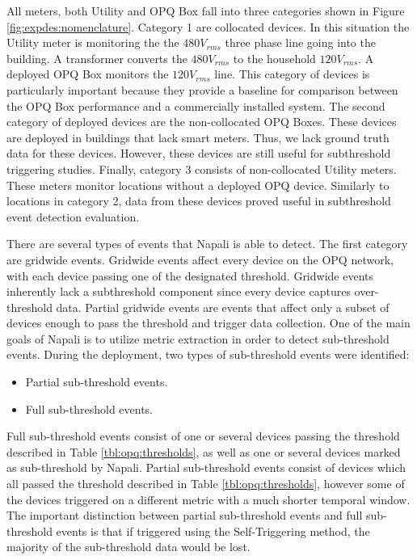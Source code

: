 All meters, both Utility and OPQ Box fall into three categories shown in Figure \ref{fig:expdes:nomenclature}.
Category 1 are collocated devices.
In this situation the Utility meter is monitoring the the $480V_{rms}$ three phase line going into the building.
A transformer converts the $480V_{rms}$ to the household $120V_{rms}$.
A deployed OPQ Box monitors the $120V_{rms}$ line.
This category of devices is particularly important because they provide a baseline for comparison between the OPQ Box performance and a commercially installed system.
The second category of deployed devices are the non-collocated OPQ Boxes.
These devices are deployed in buildings that lack smart meters.
Thus, we lack ground truth data for these devices.
However, these devices are still useful for subthreshold triggering studies.
Finally, category 3 consists of non-collocated Utility meters.
These meters monitor locations without a deployed OPQ device.
Similarly to locations in category 2, data from these devices proved useful in subthreshold event detection evaluation.

There are several types of events that Napali is able to detect.
The first category are gridwide events.
Gridwide events affect every device on the OPQ network, with each device passing one of the designated threshold.
Gridwide events inherently lack a subthreshold component since every device captures over-threshold data.
Partial gridwide events are events that affect only a subset of devices enough to pass the threshold and trigger data collection.
One of the main goals of Napali is to utilize metric extraction in order to detect sub-threshold events.
During the deployment, two types of sub-threshold events were identified:
\begin{itemize}
    \item Partial sub-threshold events.
    \item Full sub-threshold events.
\end{itemize}
Full sub-threshold events consist of one or several devices passing the threshold described in Table \ref{tbl:opq:thresholds},
as well as one or several devices marked as sub-threshold by Napali.
Partial sub-threshold events consist of devices which all passed the threshold described in Table \ref{tbl:opq:thresholds}, however some of the devices triggered on a different metric with a much shorter temporal window.
The important distinction between partial sub-threshold events and full sub-threshold events is that if triggered using the Self-Triggering method, the majority of the sub-threshold data would be lost.

